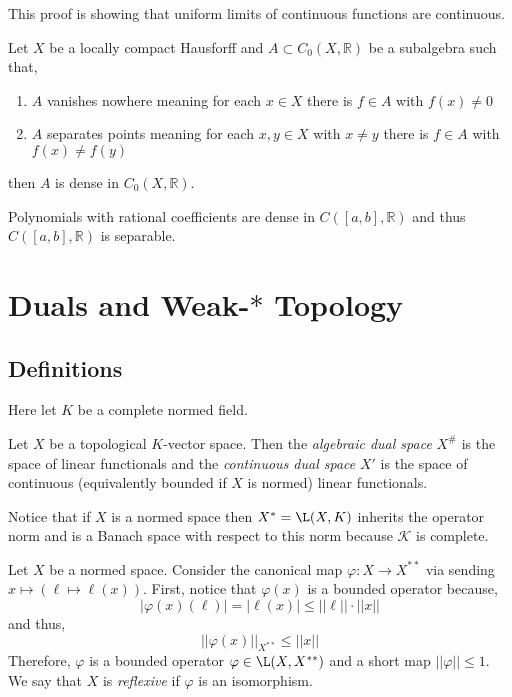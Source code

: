 \documentclass[12pt]{article}
\renewcommand{\K}{\mathbb{K}}
\newcommand{\R}{\mathbb{R}}
\renewcommand{\K}{\mathcal{K}}
\begin{document}
\begin{rmk}
This proof is showing that uniform limits of continuous functions are continuous.
\end{rmk}


\begin{thm}
Let $X$ be a locally compact Hausforff and $A \subset C_0(X, \R)$ be a subalgebra such that,
\begin{enumerate}
\item $A$ vanishes nowhere meaning for each $x \in X$ there is $f \in A$ with $f(x) \neq 0$

\item $A$ separates points meaning for each $x, y \in X$ with $x \neq y$ there is $f \in A$ with $f(x) \neq f(y)$
\end{enumerate}
then $A$ is dense in $C_0(X, \R)$.
\end{thm}

\begin{cor}
Polynomials with rational coefficients are dense in $C([a,b], \R)$ and thus $C([a,b], \R)$ is separable.
\end{cor}

\section{Duals and Weak-$*$ Topology}

\subsection{Definitions}

\begin{rmk}
Here let $K$ be a complete normed field.
\end{rmk}

\begin{defn}
Let $X$ be a topological $K$-vector space. Then the \textit{algebraic dual space} $X^\#$ is the space of linear functionals and the \textit{continuous dual space} $X'$ is the space of continuous (equivalently bounded if $X$ is normed) linear functionals.   
\end{defn}

\begin{rmk}
Notice that if $X$ is a normed space then $X^{*} = \L(X, K)$ inherits the operator norm and is a Banach space with respect to this norm because $\K$ is complete.
\end{rmk}

\begin{defn}
Let $X$ be a normed space. Consider the canonical map $\varphi : X \to X^{**}$ via sending $x \mapsto (\ell \mapsto \ell(x))$. First, notice that $\varphi(x)$ is a bounded operator because,
\[ | \varphi(x)(\ell) | = | \ell(x) | \le || \ell || \cdot || x || \]
and thus, 
\[ || \varphi(x) ||_{X^{**}} \le || x || \]
Therefore, $\varphi$ is a bounded operator $\varphi \in \L(X, X^{**})$ and a short map $|| \varphi || \le 1$. We say that $X$ is \textit{reflexive} if $\varphi$ is an isomorphism.
\end{defn}
\end{document}
